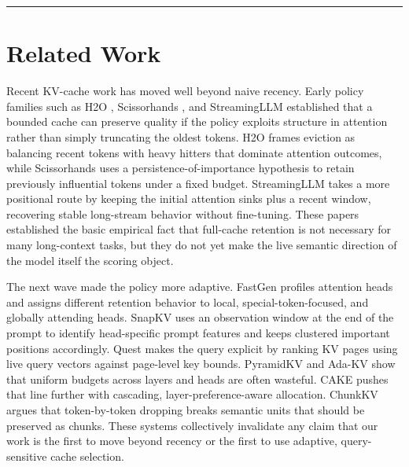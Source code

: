 \documentclass[10pt]{article}
\begin{document}
\begin{center}\rule{0.5\linewidth}{0.5pt}\end{center}

\section{Related Work}\label{2-related-work}

Recent KV-cache work has moved well beyond naive recency. Early policy
families such as H2O \citep{zhang2023h2o}, Scissorhands
\citep{liu2023scissorhands}, and StreamingLLM
\citep{xiao2023streamingllm} established that a bounded
cache can preserve quality if the policy exploits structure in attention
rather than simply truncating the oldest tokens. H2O frames eviction as
balancing recent tokens with heavy hitters that dominate attention
outcomes, while Scissorhands uses a persistence-of-importance hypothesis
to retain previously influential tokens under a fixed budget.
StreamingLLM takes a more positional route by keeping the initial
attention sinks plus a recent window, recovering stable long-stream
behavior without fine-tuning. These papers established the basic
empirical fact that full-cache retention is not necessary for many
long-context tasks, but they do not yet make the live semantic direction
of the model itself the scoring object.

The next wave made the policy more adaptive. FastGen
\citep{ge2023fastgen} profiles attention heads and
assigns different retention behavior to local, special-token-focused,
and globally attending heads. SnapKV
\citep{li2024snapkv} uses an observation window at the
end of the prompt to identify head-specific prompt features and keeps
clustered important positions accordingly. Quest
\citep{tang2024quest} makes the query explicit by
ranking KV pages using live query vectors against page-level key bounds.
PyramidKV \citep{cai2024pyramidkv} and Ada-KV
\citep{feng2024adakv} show that uniform budgets across
layers and heads are often wasteful. CAKE
\citep{qin2024cake} pushes that line further with
cascading, layer-preference-aware allocation. ChunkKV
\citep{liu2024chunkkv} argues that token-by-token
dropping breaks semantic units that should be preserved as chunks. These
systems collectively invalidate any claim that our work is the first to
move beyond recency or the first to use adaptive, query-sensitive cache
selection.
\end{document}
